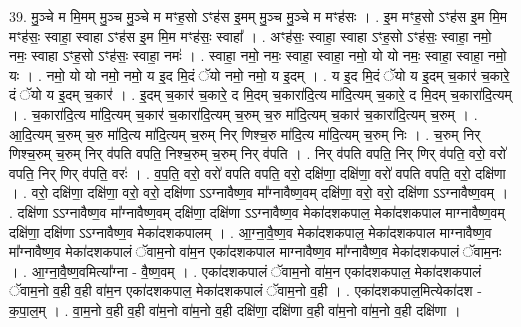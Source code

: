 \documentclass[17pt]{extarticle}
\begin{document}
39. मु॒ञ्चे म मि॒मम् मु॒ञ्च मु॒ञ्चे म मꣳह॒सो ऽꣳह॑स इ॒मम् मु॒ञ्च मु॒ञ्चे म मꣳह॑सः । . इ॒म मꣳह॒सो ऽꣳह॑स इ॒म मि॒म मꣳह॑सः॒ स्वाहा॒ स्वाहा ऽꣳह॑स इ॒म मि॒म मꣳह॑सः॒ स्वाहा᳚ । . अꣳह॑सः॒ स्वाहा॒ स्वाहा ऽꣳह॒सो ऽꣳह॑सः॒ स्वाहा॒ नमो॒ नमः॒ स्वाहा ऽꣳह॒सो ऽꣳह॑सः॒ स्वाहा॒ नमः॑ । . स्वाहा॒ नमो॒ नमः॒ स्वाहा॒ स्वाहा॒ नमो॒ यो यो नमः॒ स्वाहा॒ स्वाहा॒ नमो॒ यः । . नमो॒ यो यो नमो॒ नमो॒ य इ॒द मि॒दं ॅयो नमो॒ नमो॒ य इ॒दम् । . य इ॒द मि॒दं ॅयो य इ॒दम् च॒कार॑ च॒कारे॒ दं ॅयो य इ॒दम् च॒कार॑ । . इ॒दम् च॒कार॑ च॒कारे॒ द मि॒दम् च॒कारा॑दि॒त्य मा॑दि॒त्यम् च॒कारे॒ द मि॒दम् च॒कारा॑दि॒त्यम् । . च॒कारा॑दि॒त्य मा॑दि॒त्यम् च॒कार॑ च॒कारा॑दि॒त्यम् च॒रुम् च॒रु मा॑दि॒त्यम् च॒कार॑ च॒कारा॑दि॒त्यम् च॒रुम् । . आ॒दि॒त्यम् च॒रुम् च॒रु मा॑दि॒त्य मा॑दि॒त्यम् च॒रुम् निर् णिश्च॒रु मा॑दि॒त्य मा॑दि॒त्यम् च॒रुम् निः । . च॒रुम् निर् णिश्च॒रुम् च॒रुम् निर् व॑पति वपति॒ निश्च॒रुम् च॒रुम् निर् व॑पति । . निर् व॑पति वपति॒ निर् णिर् व॑पति॒ वरो॒ वरो॑ वपति॒ निर् णिर् व॑पति॒ वरः॑ । . व॒प॒ति॒ वरो॒ वरो॑ वपति वपति॒ वरो॒ दक्षि॑णा॒ दक्षि॑णा॒ वरो॑ वपति वपति॒ वरो॒ दक्षि॑णा । . वरो॒ दक्षि॑णा॒ दक्षि॑णा॒ वरो॒ वरो॒ दक्षि॑णा ऽऽग्नावैष्ण॒व मा᳚ग्नावैष्ण॒वम् दक्षि॑णा॒ वरो॒ वरो॒ दक्षि॑णा ऽऽग्नावैष्ण॒वम् । . दक्षि॑णा ऽऽग्नावैष्ण॒व मा᳚ग्नावैष्ण॒वम् दक्षि॑णा॒ दक्षि॑णा ऽऽग्नावैष्ण॒व मेका॑दशकपाल॒ मेका॑दशकपाल माग्नावैष्ण॒वम् दक्षि॑णा॒ दक्षि॑णा ऽऽग्नावैष्ण॒व मेका॑दशकपालम् । . आ॒ग्ना॒वै॒ष्ण॒व मेका॑दशकपाल॒ मेका॑दशकपाल माग्नावैष्ण॒व मा᳚ग्नावैष्ण॒व मेका॑दशकपालं ॅवाम॒नो वा॑म॒न एका॑दशकपाल माग्नावैष्ण॒व मा᳚ग्नावैष्ण॒व मेका॑दशकपालं ॅवाम॒नः । . आ॒ग्ना॒वै॒ष्ण॒वमित्या᳚ग्ना - वै॒ष्ण॒वम् । . एका॑दशकपालं ॅवाम॒नो वा॑म॒न एका॑दशकपाल॒ मेका॑दशकपालं ॅवाम॒नो व॒ही व॒ही वा॑म॒न एका॑दशकपाल॒ मेका॑दशकपालं ॅवाम॒नो व॒ही । . एका॑दशकपाल॒मित्येका॑दश - क॒पा॒ल॒म् । . वा॒म॒नो व॒ही व॒ही वा॑म॒नो वा॑म॒नो व॒ही दक्षि॑णा॒ दक्षि॑णा व॒ही वा॑म॒नो वा॑म॒नो व॒ही दक्षि॑णा । \newline
\end{document}
